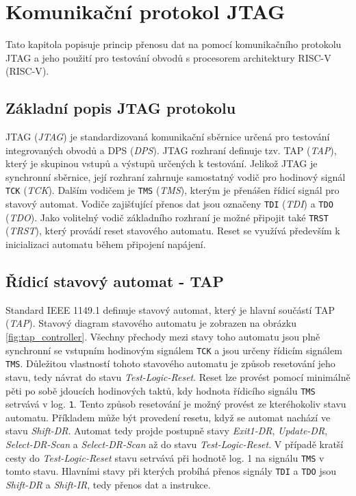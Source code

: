 \chapter{Komunikační protokol JTAG}
Tato kapitola popisuje princip přenosu dat na pomocí komunikačního protokolu JTAG a jeho použití pro testování obvodů s procesorem architektury \acs{RISC-V} (\acl{RISC-V}).

\section{Základní popis \acs{JTAG} protokolu}
\acs{JTAG} (\textit{\acl{JTAG}}) je standardizovaná komunikační sběrnice určená pro testování integrovaných obvodů a \acs{DPS} (\textit{\acl{DPS}}).
\acs{JTAG} rozhraní definuje tzv. \acs{TAP} (\textit{\acl{TAP}}), který je skupinou vstupů a výstupů určených k testování. Jelikož \acs{JTAG} je synchronní sběrnice, její rozhraní zahrnuje samostatný vodič pro hodinový signál \texttt{\acs{TCK}} (\textit{\acl{TCK}}). Dalším vodičem je \texttt{\acs{TMS}} (\textit{\acl{TMS}}), kterým je přenášen řídicí signál pro stavový automat. Vodiče zajišťující přenos dat jsou označeny \texttt{\acs{TDI}} (\textit{\acl{TDI}}) a \texttt{\acs{TDO}} (\textit{\acl{TDO}}). Jako volitelný vodič základního rozhraní je možné připojit také \texttt{\acs{TRST}} (\textit{\acl{TRST}}), který provádí reset stavového automatu. Reset se využívá především k inicializaci automatu během připojení napájení. \cite {IEEE_1149-1} \cite{JTAG}      

\section{Řídicí stavový automat - \acs{TAP}}
Standard IEEE 1149.1 definuje stavový automat, který je hlavní součástí \acs{TAP} (\textit{\acl{TAP}}). Stavový diagram stavového automatu je zobrazen na obrázku \ref{fig:tap_controller}. Všechny přechody mezi stavy toho automatu jsou plně synchronní se vstupním hodinovým signálem \texttt{\acs{TCK}} a jsou určeny řídicím signálem \texttt{\acs{TMS}}. Důležitou vlastností tohoto stavového automatu je způsob resetování jeho stavu, tedy návrat do stavu \textit{Test-Logic-Reset}. Reset lze provést pomocí minimálně pěti po sobě jdoucích hodinových taktů, kdy hodnota řídicího signálu \texttt{\acs{TMS}} setrvává v log. \texttt{1}. Tento způsob resetování je možný provést ze kteréhokoliv stavu automatu. Příkladem může být provedení resetu, když se automat nachází ve stavu \textit{Shift-DR}. Automat tedy projde postupně stavy \textit{Exit1-DR}, \textit{Update-DR}, \textit{Select-DR-Scan} a \textit{Select-DR-Scan} až do stavu \textit{Test-Logic-Reset}. V případě kratší cesty do \textit{Test-Logic-Reset} stavu setrvává při hodnotě log. 1 na signálu \texttt{\acs{TMS}} v tomto stavu. Hlavními stavy při kterých probíhá přenos signály \texttt{\acs{TDI}} a \texttt{\acs{TDO}} jsou \textit{Shift-DR} a \textit{Shift-IR}, tedy přenos dat a instrukce. \cite {IEEE_1149-1}

